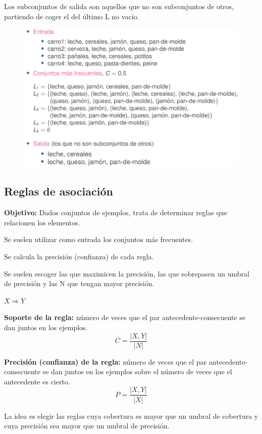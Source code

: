 \documentclass[12pt, twoside, openright]{report} %
\begin{document}
Los subconjuntos de salida son aquellos que no son subconjuntos de otros, partiendo de coger el del último L no vacío.

\begin{figure}[H]
	{\includegraphics[scale=.4]{2021-04-10 01_06_33-ensembles-reglasAsociacion.pdf - Foxit Reader.png}}
\end{figure}

\subsection{Reglas de asociación}
\textbf{Objetivo:} Dados conjuntos de ejemplos, trata de determinar reglas que relacionen los elementos.

Se suelen utilizar como entrada los conjuntos más frecuentes.

Se calcula la precisión (confianza) de cada regla.

Se suelen escoger las que maximicen la precisión, las que sobrepasen un umbral de precisión y las N que tengan mayor precisión.

\begin{center}
	$X \Rightarrow Y$
\end{center}

\textbf{Soporte de la regla:} número de veces que el par antecedente-consecuente se dan juntos en los ejemplos.
$$C = \frac{|X, Y|}{|N|}$$

\textbf{Precisión (confianza) de la regla:} número de veces que el par antecedente-consecuente se dan juntos en los ejemplos sobre el número de veces que el antecedente es cierto.
$$P = \frac{|X, Y|}{|X|}$$

La idea es elegir las reglas cuya cobertura es mayor que un umbral de cobertura y cuya precisión sea mayor que un umbral de precisión.
\end{document}
